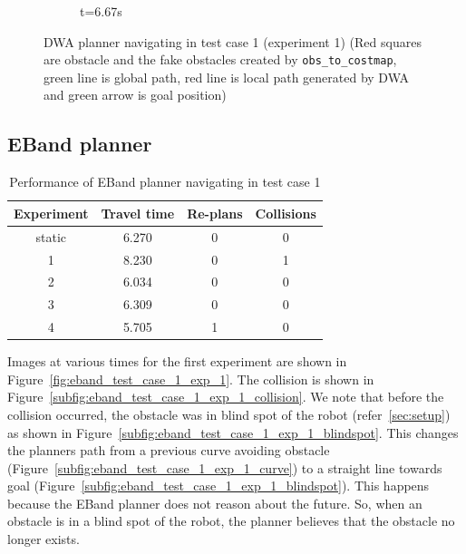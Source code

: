 \begin{figure}[ht]
\begin{subfigure}[b]{0.30\linewidth}
        \caption{t=6.67s}
    \end{subfigure}%
    \caption{DWA planner navigating in test case 1 (experiment 1) (Red squares are obstacle and the
    fake obstacles created by \texttt{obs\_to\_costmap}, green line is global path, red line is 
    local path generated by DWA and green arrow is goal position)}\label{fig:dwa_test_case_exp_1}
\end{figure}

\subsection{EBand planner}%
\label{sub:eval_eband_planner}

\begin{table}[H]
    \centering
    \begin{tabular}{cccc}
        \textbf{Experiment} & \textbf{Travel time} & \textbf{Re-plans} & \textbf{Collisions} \\\toprule
        static & 6.270 & 0 & 0 \\
             1 & 8.230 & 0 & 1 \\
             2 & 6.034 & 0 & 0 \\
             3 & 6.309 & 0 & 0 \\
             4 & 5.705 & 1 & 0 \\
    \end{tabular}
    \caption{Performance of EBand planner navigating in test case 1}\label{tab:perfomance_eband_test_case_1}
\end{table}

Images at various times for the first experiment are shown in Figure~\ref{fig:eband_test_case_1_exp_1}.
The collision is shown in Figure~\ref{subfig:eband_test_case_1_exp_1_collision}. We note that before
the collision occurred, the obstacle was in blind spot of the robot (refer~\ref{sec:setup}) as shown in Figure~\ref{subfig:eband_test_case_1_exp_1_blindspot}.
This changes the planners path from a previous curve avoiding obstacle (Figure~\ref{subfig:eband_test_case_1_exp_1_curve}) to a straight
line towards goal (Figure~\ref{subfig:eband_test_case_1_exp_1_blindspot}). This happens because the EBand planner
does not reason about the future. So, when an obstacle is in a blind spot of the robot, the planner 
believes that the obstacle no longer exists.

